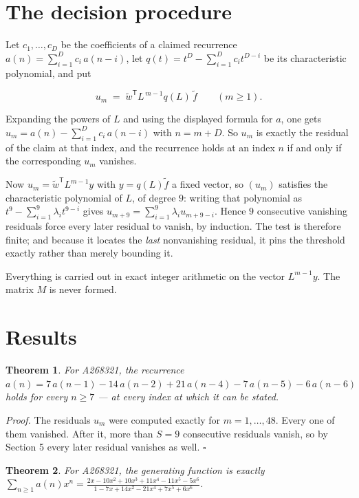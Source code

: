 \documentclass[11pt]{article}
\newtheorem{theorem}{Theorem}
\theoremstyle{definition}
\begin{document}
\section{The decision procedure}

Let $c_1,\dots,c_D$ be the coefficients of a claimed recurrence $a(n) = \sum_{i=1}^{D} c_i\,a(n-i)$, let $q(t) = t^{D} - \sum_{i=1}^{D} c_i t^{D-i}$ be its characteristic polynomial, and put

\[u_m \;=\; \tilde w^{\mathsf T} L^{\,m-1} q(L)\,\tilde f \qquad (m \ge 1).\]

Expanding the powers of $L$ and using the displayed formula for $a$, one gets $u_m = a(n) - \sum_{i=1}^{D} c_i\,a(n-i)$ with $n = m + D$. So $u_m$ is exactly the residual of the claim at that index, and the recurrence holds at an index $n$ if and only if the corresponding $u_m$ vanishes.

Now $u_m = \tilde w^{\mathsf T} L^{m-1} y$ with $y = q(L)\tilde f$ a fixed vector, so $(u_m)$ satisfies the characteristic polynomial of $L$, of degree $9$: writing that polynomial as $t^{9} - \sum_{i=1}^{9} \lambda_i t^{9-i}$ gives $u_{m+9} = \sum_{i=1}^{9} \lambda_i u_{m+9-i}$. Hence $9$ consecutive vanishing residuals force every later residual to vanish, by induction. The test is therefore finite; and because it locates the {\itshape last} nonvanishing residual, it pins the threshold exactly rather than merely bounding it.

Everything is carried out in exact integer arithmetic on the vector $L^{m-1}y$. The matrix $M$ is never formed.

\section{Results}

\begin{theorem} For A268321, the recurrence $a(n) = 7\,a(n-1) - 14\,a(n-2) + 21\,a(n-4) - 7\,a(n-5) - 6\,a(n-6)$ holds for every $n \ge 7$ --- at every index at which it can be stated.\end{theorem}

{\itshape Proof.} The residuals $u_m$ were computed exactly for $m = 1,\dots,48$. Every one of them vanished. After it, more than $S = 9$ consecutive residuals vanish, so by Section 5 every later residual vanishes as well. $\square$

\begin{theorem} For A268321, the generating function is exactly $\sum_{n\ge 1} a(n)x^n = \frac{2x - 10x^{2} + 10x^{3} + 11x^{4} - 11x^{5} - 5x^{6}}{1 - 7x + 14x^{2} - 21x^{4} + 7x^{5} + 6x^{6}}$.\end{theorem}
\end{document}
